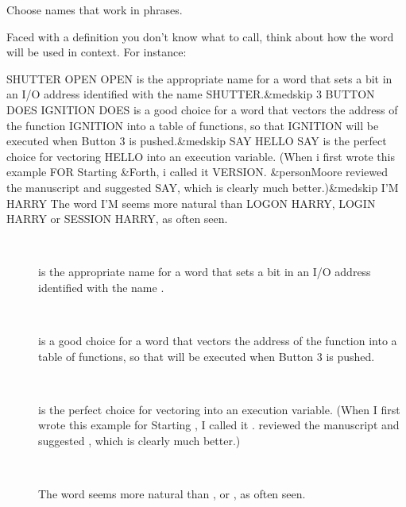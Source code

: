 %
\begin{tip}
Choose names that work in phrases.
\end{tip}
Faced with a definition you don't know what to call, think about how the
word will be used in context.  For instance:
\ifeightyfour
\begin{Code}[fontfamily=cmss,commandchars=\&\{\}]
SHUTTER OPEN
  OPEN is the appropriate name for a word that sets a
  bit in an I/O address identified with the name
  SHUTTER.&medskip
3 BUTTON DOES IGNITION
  DOES is a good choice for a word that vectors the
  address of the function IGNITION into a table of
  functions, so that IGNITION will be executed when
  Button 3 is pushed.&medskip
SAY HELLO
  SAY is the perfect choice for vectoring HELLO into an
  execution variable.  (When i first wrote this example
  FOR Starting &Forth{}, i called it VERSION. &person{Moore}
  reviewed the manuscript and suggested SAY, which is
  clearly much better.)&medskip
I'M HARRY
  The word I'M seems more natural than LOGON HARRY,
  LOGIN HARRY or SESSION HARRY, as often seen.
\end{Code}
\else
\begin{description}
\item[]~

   is the appropriate name for a word that sets a
  bit in an I/O address identified with the name
  .
\item[]~

   is a good choice for a word that vectors the
  address of the function  into a table of
  functions, so that  will be executed when
  Button 3 is pushed.
\item[]~

   is the perfect choice for vectoring  into an
  execution variable.  (When I first wrote this example
  for Starting \Forth{}, I called it . 
  reviewed the manuscript and suggested , which is
  clearly much better.)
\item[]~

  The word  seems more natural than ,
   or , as often seen.
\end{description}
\fi


